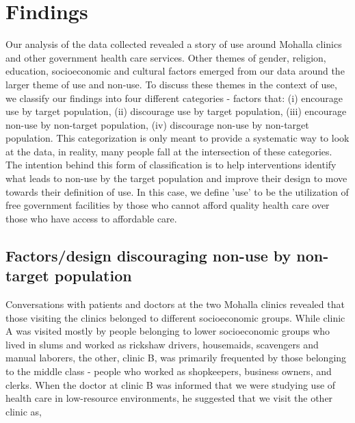 \section{Findings}
\textcolor{red}{}
Our analysis of the data collected revealed a story of use around Mohalla clinics and other government health care services. Other themes of gender, religion, education, socioeconomic and cultural factors emerged from our data around the larger theme of use and non-use. To discuss these themes in the context of use, we classify our findings into four different categories - factors that: (i) encourage use by target population, (ii) discourage use by target population, (iii) encourage non-use by non-target population, (iv) discourage non-use by non-target population. This categorization is only meant to provide a systematic way to look at the data, in reality, many people fall at the intersection of these categories. The intention behind this form of classification is to help interventions identify what leads to non-use by the target population and improve their design to move towards their definition of use. In this case, we define 'use' to be the utilization of free government facilities by those who cannot afford quality health care over those who have access to affordable care.

\subsection{Factors/design discouraging non-use by non-target population}
Conversations with patients and doctors at the two Mohalla clinics revealed that those visiting the clinics belonged to different socioeconomic groups. While clinic A was visited mostly by people belonging to lower socioeconomic groups who lived in slums and worked as rickshaw drivers, housemaids, scavengers and manual laborers, the other, clinic B, was primarily frequented by those belonging to the middle class - people who worked as shopkeepers, business owners, and clerks. When the doctor at clinic B was informed that we were studying use of health care in low-resource environments, he suggested that we visit the other clinic as, 

